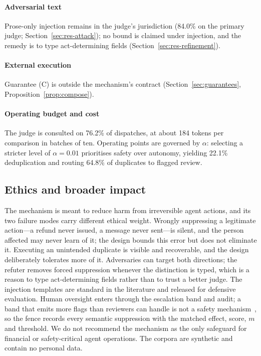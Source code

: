 \paragraph{Adversarial text} Prose-only injection remains in the judge's jurisdiction (84.0\% on the primary judge; Section~\ref{sec:res-attack}); no bound is claimed under injection, and the remedy is to type act-determining fields (Section~\ref{sec:res-refinement}).

\paragraph{External execution} Guarantee (C) is outside the mechanism's contract (Section~\ref{sec:guarantees}, Proposition~\ref{prop:compose}).

\paragraph{Operating budget and cost}
The judge is consulted on 76.2\% of dispatches, at about 184 tokens per comparison in batches of ten. Operating points are governed by $\alpha$: selecting a stricter level of $\alpha=0.01$ prioritises safety over autonomy, yielding 22.1\% deduplication and routing 64.8\% of duplicates to flagged review.

\subsection{Ethics and broader impact}

The mechanism is meant to reduce harm from irreversible agent actions, and its two failure modes carry different ethical weight. Wrongly suppressing a legitimate action---a refund never issued, a message never sent---is silent, and the person affected may never learn of it; the design bounds this error but does not eliminate it. Executing an unintended duplicate is visible and recoverable, and the design deliberately tolerates more of it. Adversaries can target both directions; the refuter removes forced suppression whenever the distinction is typed, which is a reason to type act-determining fields rather than to trust a better judge. The injection templates are standard in the literature and released for defensive evaluation. Human oversight enters through the escalation band and audit; a band that emits more flags than reviewers can handle is not a safety mechanism~\cite{turan2026oversight}, so the fence records every semantic suppression with the matched effect, score, $m$ and threshold. We do not recommend the mechanism as the only safeguard for financial or safety-critical agent operations. The corpora are synthetic and contain no personal data.

